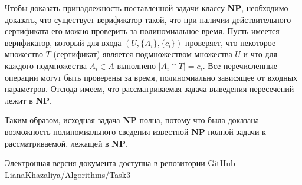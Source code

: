 \documentclass[10pt]{article}
\begin{document}
\medskip\par 
Чтобы доказать принадлежность поставленной задачи классу \textbf{NP}, необходимо доказать, что существует верификатор такой, что при наличии действительного сертификата его можно проверить за полиномиальное время. Пусть имеется верификатор, который для входа $(U, \{A_i\},\{c_i\})$ проверяет, что некоторое множество $T$ (сертификат) является подмножеством множества $U$ и что для каждого подмножества $A_i \in A$ выполнено $|A_i\cap T| = c_i$. Все перечисленные операции могут быть проверены за время, полиномиально зависящее от входных параметров. Отсюда имеем, что рассматриваемая задача выведения пересечений лежит в \textbf{NP}.
\medskip\par 
Таким образом, исходная задача \textbf{NP}-полна, потому что была доказана возможность полиномиального сведения известной \textbf{NP}-полной задачи к рассматриваемой, лежащей в \textbf{NP}. 
\ \\[0.2 cm]
\hline

\begin{flushright}
Электронная версия документа доступна в репозитории GitHub \\
\href{https://github.com/LianaKhazaliya/Algorithms/blob/master/Task3/NP_completeness.pdf}{LianaKhazaliya/Algorithms/Task3}
\end{flushright}
\end{document}
